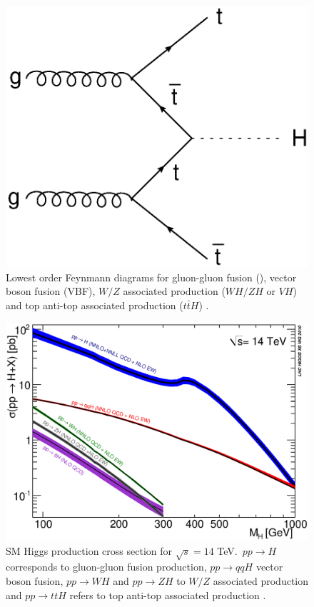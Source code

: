 \begin{figure}[h]
\begin{minipage}[h]{0.4\linewidth}
					\end{minipage}
					\quad\quad
					\begin{minipage}[h]{0.4\linewidth}
						\includegraphics[width=1\linewidth]{T/FIGS/tth}
					\end{minipage}
				\caption[Feynmann diagrams of lowest order Higgs production processes]{Lowest order Feynmann diagrams for gluon-gluon fusion (\ggF), vector boson fusion (VBF), $W/Z$ associated production ($WH/ZH$ or $VH$) and top anti-top associated production ($t\bar{t}H$) \cite{higgsproduction}.}
				\label{fig:higgsproddiag}
			\end{figure}

			\begin{figure}[h]
				\centering
				\includegraphics[width=0.7\linewidth]{T/FIGS/YRHXS_Summary_fig3}
				\caption[Higgs production cross section as a function of Higgs mass at a $\sqrt{s}=14$TeV]{SM Higgs production cross section for $\sqrt{s}=14$ TeV. $\,pp\rightarrow H$ corresponds to gluon-gluon fusion production, $pp\rightarrow qqH$ vector boson fusion, $pp\rightarrow WH$ and $pp\rightarrow ZH$ to $W/Z$ associated production and  $pp\rightarrow ttH$ refers to top anti-top associated production \cite{LHCHiggsCS}.}
				\label{fig:higgsproductionCS}
			\end{figure}



